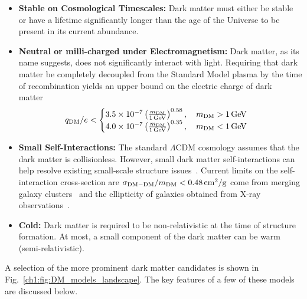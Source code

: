\begin{itemize}
    \item \textbf{Stable on Cosmological Timescales:} Dark matter must either be stable or have a lifetime significantly longer than the age of the Universe to be present in its current abundance. 
    
    \item \textbf{Neutral or milli-charged under Electromagnetism:} Dark matter, as its name suggests, does not significantly interact with light. Requiring that dark matter be completely decoupled from the Standard Model plasma by the time of recombination yields an upper bound on the electric charge of dark matter~\cite{McDermott:2010pa_TurningLightsHow} 
    \begin{equation}
        q_\mathrm{DM}/e < \begin{cases}
            3.5\times10^{-7} \left( \frac{m_\mathrm{DM}}{1{\rm \,GeV}}\right)^{0.58},\quad m_\mathrm{DM} > 1{\rm \,GeV}\\
            4.0\times 10^{-7}\left( \frac{m_\mathrm{DM}}{1{\rm \,GeV}}\right)^{0.35},\quad m_\mathrm{DM} <1{\rm \,GeV}
        \end{cases}
    \end{equation}
    
    \item \textbf{Small Self-Interactions:} The standard $\Lambda$CDM cosmology assumes that the dark matter is collisionless. However, small dark matter self-interactions can help resolve existing small-scale structure issues~\cite{Tulin:2017ara_feb_DarkMatterSelfinteractions, Spergel:1999mh_Observationalevidenceselfinteracting}. Current limits on the self-interaction cross-section are $\sigma_{\mathrm{DM-DM}}/m_\mathrm{DM} < 0.48{\rm \,cm}^2/\mathrm{g}$ come from merging galaxy clusters~\cite{Randall:2008ppe_ConstraintsSelfInteractionCrossSection} and the ellipticity of galaxies obtained from X-ray observations~\cite{Buote:2002wd_ChandraEvidenceFlattened}.

    \item \textbf{Cold:} Dark matter is required to be non-relativistic at the time of structure formation. At most, a small component of the dark matter can be warm (semi-relativistic).
\end{itemize}
A selection of the more prominent dark matter candidates is shown in Fig.~\ref{ch1:fig:DM_models_landscape}. The key features of a few of these models are discussed below.


